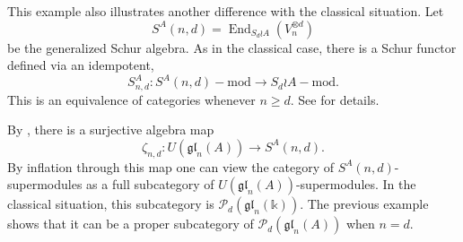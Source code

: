 \documentclass[11pt,reqno]{amsart} %
\newcommand{\gl}{\mathfrak{gl}}
\renewcommand{\k}{\mathds{k}}
\newcommand{\0}{\bar{0}}
\newcommand{\1}{\bar{1}}
\newcommand{\wreath}{\wr}
\newcommand{\SdwreathA}{S_{d} \wreath A}
\newcommand{\End}{\operatorname{End}}
\newcommand{\Pol}{\mathcal{P}}
\numberwithin{equation}{subsection}
\begin{document}
This example also illustrates another difference with the classical situation.  Let 
\[
S^{A}(n,d) = \End_{\SdwreathA}\left(V_{n}^{\otimes d} \right)
\] be the generalized Schur algebra.  As in the classical case, there is a Schur functor defined via an idempotent, 
\[
{S}^{A}_{n,d}: S^{A}(n,d)-\textrm{mod} \to \SdwreathA -\textrm{mod}.
\]
This is an equivalence of categories whenever $n \geq d$.  See \cite[Section~5]{EvseevKleshchev} for details.

By \cite[Lemma 11.1.1]{DKMZ}, there is a surjective algebra map 
\[
\zeta_{n,d}: U(\gl_{n}(A)) \to S^{A}(n,d).
\]  By inflation through this map one can view the category of $S^{A}(n,d)$-supermodules as a full subcategory of $U(\gl_{n}(A))$-supermodules.  In the classical situation, this subcategory is $\Pol_{d}(\gl_{n}(\k))$.  The previous example shows that it can be a proper subcategory of $\Pol_{d}(\gl_{n}(A))$ when $n=d$.



\makeatletter
\renewcommand*{\@biblabel}[1]{\hfill#1.}
\makeatother



\end{document}
